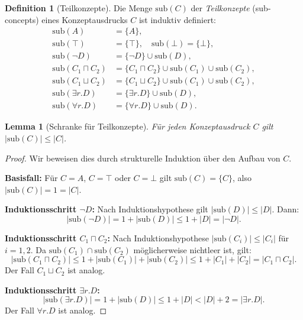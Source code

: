 ﻿\documentclass[a4paper,12pt]{article}
\theoremstyle{definition}
\newtheorem{definition}{Definition}[section]
\theoremstyle{plain}
\newtheorem{lemma}{Lemma}[section]
\theoremstyle{remark}
\begin{document}
\begin{definition}[Teilkonzepte]
Die Menge $\mathrm{sub}(C)$ der \emph{Teilkonzepte} (sub-concepts)
eines Konzeptausdrucks $C$ ist induktiv definiert:
\begin{align*}
  \mathrm{sub}(A) &= \{A\}, \\
  \mathrm{sub}(\top) &= \{\top\}, \quad
  \mathrm{sub}(\bot) = \{\bot\}, \\
  \mathrm{sub}(\neg D) &= \{\neg D\} \cup \mathrm{sub}(D), \\
  \mathrm{sub}(C_1 \sqcap C_2) &=
    \{C_1 \sqcap C_2\} \cup \mathrm{sub}(C_1) \cup \mathrm{sub}(C_2), \\
  \mathrm{sub}(C_1 \sqcup C_2) &=
    \{C_1 \sqcup C_2\} \cup \mathrm{sub}(C_1) \cup \mathrm{sub}(C_2), \\
  \mathrm{sub}(\exists r.D) &= \{\exists r.D\} \cup \mathrm{sub}(D), \\
  \mathrm{sub}(\forall r.D) &= \{\forall r.D\} \cup \mathrm{sub}(D).
\end{align*}
\end{definition}

\begin{lemma}[Schranke f{\"{u}}r Teilkonzepte]
\label{lem:subcon-bound}
F{\"{u}}r jeden Konzeptausdruck $C$ gilt $|\mathrm{sub}(C)| \leq |C|$.
\end{lemma}

\begin{proof}
Wir beweisen dies durch strukturelle Induktion {\"{u}}ber den Aufbau von $C$.

\textbf{Basisfall:} F{\"{u}}r $C = A$, $C = \top$ oder $C = \bot$ gilt
$\mathrm{sub}(C) = \{C\}$, also $|\mathrm{sub}(C)| = 1 = |C|$. \checkmark

\textbf{Induktionsschritt $\neg D$:}
Nach Induktionshypothese gilt $|\mathrm{sub}(D)| \leq |D|$.
Dann:
\[
  |\mathrm{sub}(\neg D)| = 1 + |\mathrm{sub}(D)| \leq 1 + |D| = |\neg D|.
\]

\textbf{Induktionsschritt $C_1 \sqcap C_2$:}
Nach Induktionshypothese $|\mathrm{sub}(C_i)| \leq |C_i|$ f{\"{u}}r $i=1,2$.
Da $\mathrm{sub}(C_1) \cap \mathrm{sub}(C_2)$ m{\"{o}}glicherweise
nichtleer ist, gilt:
\[
  |\mathrm{sub}(C_1 \sqcap C_2)|
  \leq 1 + |\mathrm{sub}(C_1)| + |\mathrm{sub}(C_2)|
  \leq 1 + |C_1| + |C_2|
  = |C_1 \sqcap C_2|.
\]
Der Fall $C_1 \sqcup C_2$ ist analog.

\textbf{Induktionsschritt $\exists r.D$:}
\[
  |\mathrm{sub}(\exists r.D)|
  = 1 + |\mathrm{sub}(D)|
  \leq 1 + |D|
  < |D| + 2
  = |\exists r.D|.
\]
Der Fall $\forall r.D$ ist analog. \qedhere
\end{proof}
\end{document}
